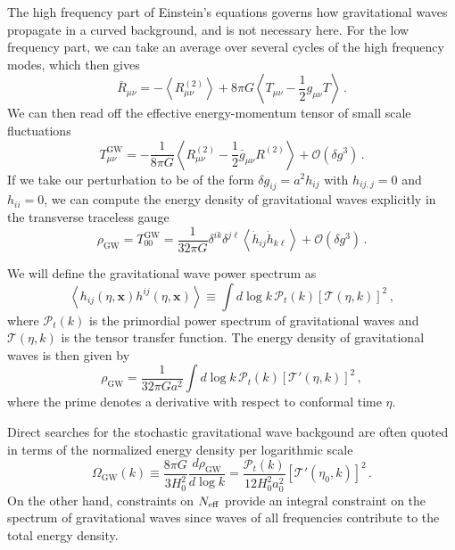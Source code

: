 The high frequency part of Einstein's equations governs how gravitational waves propagate in a curved background, and is not necessary here.  For the low frequency part, we can take an average over several cycles of the high frequency modes, which then gives
\begin{equation}\label{eq:Einstein_Eq_GW}
	\bar{R}_{\mu\nu} = -\left\langle R_{\mu\nu}^{(2)}\right\rangle + 8\pi G \left\langle T_{\mu\nu}-\frac{1}{2}g_{\mu\nu}T\right\rangle \, .
\end{equation}
We can then read off the effective energy-momentum tensor of small scale fluctuations
\begin{equation}\label{eq:EM_Tensor_GW}
	T_{\mu\nu}^\mathrm{GW} = -\frac{1}{8\pi G} \left \langle R_{\mu\nu}^{(2)}-\frac{1}{2}\bar{g}_{\mu\nu}R^{(2)} \right\rangle + \mathcal{O}(\delta g^3) \, .
\end{equation}
If we take our perturbation to be of the form $\delta g_{ij} = a^2 h_{ij}$ with $h_{ij,j} = 0$ and $h_{ii} = 0$, we can compute the energy density of gravitational waves explicitly in the transverse traceless gauge
\begin{equation}\label{eq:Energy_GW}
	\rho_\mathrm{GW} = T_{00}^\mathrm{GW} = \frac{1}{32 \pi G}\delta^{ik}\delta^{j\ell}\left\langle \dot{h}_{ij} \dot{h}_{k\ell} \right\rangle + \mathcal{O}(\delta g^3) \, .
\end{equation}

We will define the gravitational wave power spectrum as
\begin{equation}\label{eq:GW_power_spectrum}
	\left\langle h_{ij}(\eta,\mathbf{x})h^{ij}(\eta,\mathbf{x})\right\rangle \equiv \int  d \log k \, \mathcal{P}_t(k) \left[\mathcal{T}(\eta,k)\right]^2 \, ,
\end{equation}
where $\mathcal{P}_t(k)$ is the primordial power spectrum of gravitational waves and $\mathcal{T}(\eta,k)$ is the tensor transfer function.  The energy density of gravitational waves is then given by
\begin{equation}\label{eq:GW_energy_density}
	\rho_\mathrm{GW} = \frac{1}{32\pi G a^2}\int  d\log k \, \mathcal{P}_t(k) \left[\mathcal{T}'(\eta,k)\right]^2 \, ,
\end{equation}
where the prime denotes a derivative with respect to conformal time $\eta$.

Direct searches for the stochastic gravitational wave backgound are often quoted in terms of the normalized energy density per logarithmic scale
\begin{equation}\label{eq:Omega_GW}
	\Omega_\mathrm{GW}(k) \equiv \frac{8\pi G}{3H_0^2}\frac{d\rho_\mathrm{GW}}{d\log k} = \frac{\mathcal{P}_t(k)}{12H_0^2a_0^2} \left[\mathcal{T}'(\eta_0,k)\right]^2 \, .
\end{equation}
On the other hand, constraints on $N_{\rm eff}$ provide an integral constraint on the spectrum of gravitational waves since waves of all frequencies contribute to the total energy density.

